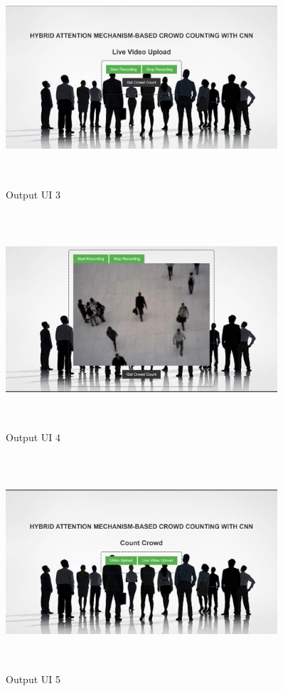 \documentclass[12pt]{report}
\begin{document}
\begin{figure}[htbp]
  \centering
  \includegraphics [width=0.9\textwidth, height=8cm]{3.png}
  \caption{Output UI 3}
  \label{fig:image}
\end{figure}

\begin{figure}[htbp]
  \centering
  \includegraphics [width=0.9\textwidth, height=8cm]{4.png}
  \caption{Output UI 4}
  \label{fig:image}
\end{figure}

\begin{figure}[htbp]
  \centering
  \includegraphics [width=0.9\textwidth, height=8cm]{5.png}
  \caption{Output UI 5}
  \label{fig:image}
\end{figure}
\end{document}
